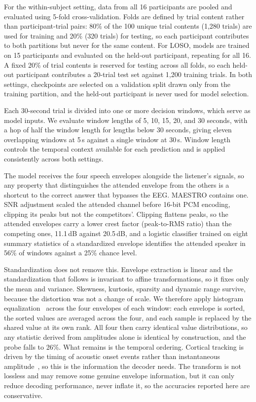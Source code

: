 \documentclass[journal]{IEEEtran}
\begin{document}
For the within-subject setting, data from all 16 participants are pooled and evaluated using 5-fold cross-validation. Folds are defined by trial content rather than participant-trial pairs: 80\% of the 100 unique trial contents (1,280 trials) are used for training and 20\% (320 trials) for testing, so each participant contributes to both partitions but never for the same content. For LOSO, models are trained on 15 participants and evaluated on the held-out participant, repeating for all 16. A fixed 20\% of trial contents is reserved for testing across all folds, so each held-out participant contributes a 20-trial test set against 1,200 training trials. In both settings, checkpoints are selected on a validation split drawn only from the training partition, and the held-out participant is never used for model selection.

Each 30-second trial is divided into one or more decision windows, which serve as model inputs. We evaluate window lengths of 5, 10, 15, 20, and 30 seconds, with a hop of half the window length for lengths below 30 seconds, giving eleven overlapping windows at 5\,s against a single window at 30\,s. Window length controls the temporal context available for each prediction and is applied consistently across both settings.

The model receives the four speech envelopes alongside the listener's signals, so any property that distinguishes the attended envelope from the others is a shortcut to the correct answer that bypasses the EEG. MAESTRO contains one. SNR adjustment scaled the attended channel before 16-bit PCM encoding, clipping its peaks but not the competitors'. Clipping flattens peaks, so the attended envelopes carry a lower crest factor (peak-to-RMS ratio) than the competing ones, 11.1\,dB against 20.5\,dB, and a logistic classifier trained on eight summary statistics of a standardized envelope identifies the attended speaker in 56\% of windows against a 25\% chance level.

Standardization does not remove this. Envelope extraction is linear and the standardization that follows is invariant to affine transformations, so it fixes only the mean and variance. Skewness, kurtosis, sparsity and dynamic range survive, because the distortion was not a change of scale. We therefore apply histogram equalization~\cite{heq1420370} across the four envelopes of each window: each envelope is sorted, the sorted values are averaged across the four, and each sample is replaced by the shared value at its own rank. All four then carry identical value distributions, so any statistic derived from amplitudes alone is identical by construction, and the probe falls to 26\%. What remains is the temporal ordering. Cortical tracking is driven by the timing of acoustic onset events rather than instantaneous amplitude~\cite{oganian2019speech}, so this is the information the decoder needs. The transform is not lossless and may remove some genuine envelope information, but it can only reduce decoding performance, never inflate it, so the accuracies reported here are conservative.
\end{document}
